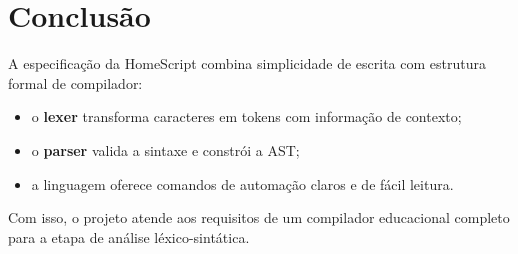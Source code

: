 \documentclass[12pt,a4paper]{article}
\begin{document}
\section{Conclusão}
A especificação da HomeScript combina simplicidade de escrita com estrutura formal de compilador:
\begin{itemize}
  \item o \textbf{lexer} transforma caracteres em tokens com informação de contexto;
  \item o \textbf{parser} valida a sintaxe e constrói a AST;
  \item a linguagem oferece comandos de automação claros e de fácil leitura.
\end{itemize}

Com isso, o projeto atende aos requisitos de um compilador educacional completo para a etapa de análise léxico-sintática.
\end{document}
